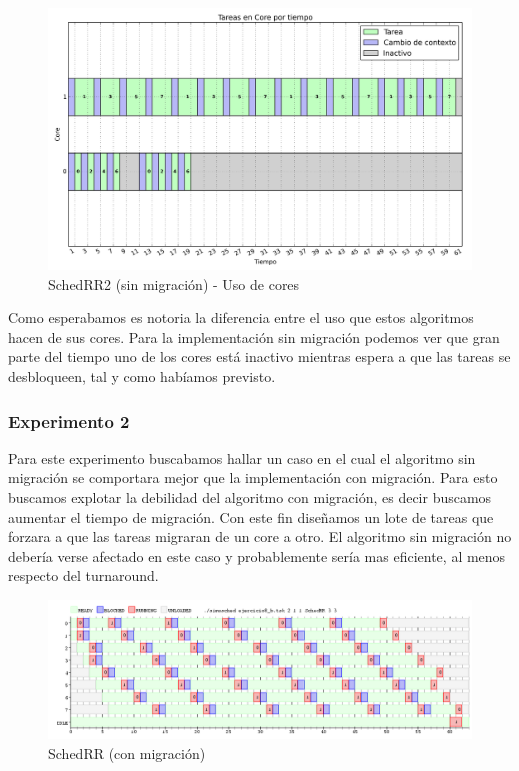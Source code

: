 \documentclass[a4paper,11pt]{article}
\begin{document}
		\begin{figure}[H]
		\centering
		\includegraphics[scale=.4, width=1\textwidth]{graficos/ej8-a2-2c-cores}
		\caption{SchedRR2 (sin migración) - Uso de cores}
		\end{figure}	

		Como esperabamos es notoria la diferencia entre el uso que estos algoritmos hacen de sus cores. Para la implementación sin migración podemos ver que gran parte del tiempo uno de los cores está inactivo mientras espera a que las tareas se desbloqueen, tal y como habíamos previsto.
		
		\subsubsection{Experimento 2}
		Para este experimento buscabamos hallar un caso en el cual el algoritmo sin migración se comportara mejor que la implementación con migración. Para esto buscamos explotar la debilidad del algoritmo con migración, es decir buscamos aumentar el tiempo de migración. 
		Con este fin diseñamos un lote de tareas que forzara a que las tareas migraran de un core a otro. El algoritmo sin migración no debería verse afectado en este caso y probablemente sería mas eficiente, al menos respecto del turnaround.

		\begin{figure}[H]
		\centering
		\includegraphics[scale=.4, width=1\textwidth]{graficos/ej8-b1-2c}
		\caption{SchedRR (con migración)}
		\end{figure}
		
\end{document}
